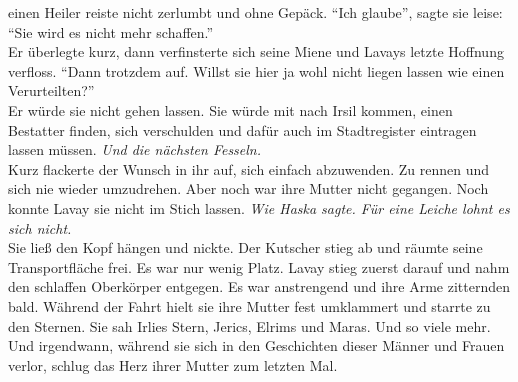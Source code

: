 einen Heiler reiste nicht zerlumbt und ohne Gepäck. ``Ich glaube'', sagte sie leise: ``Sie wird 
es nicht mehr schaffen.''\\
Er überlegte kurz, dann verfinsterte sich seine Miene und Lavays letzte Hoffnung verfloss. ``Dann 
trotzdem auf. Willst sie hier ja wohl nicht liegen lassen wie einen Verurteilten?''\\
Er würde sie nicht gehen lassen. Sie würde mit nach Irsil kommen, einen Bestatter finden, sich 
verschulden und dafür auch im Stadtregister eintragen lassen müssen. \textit{Und die nächsten 
Fesseln.}\\
Kurz flackerte der Wunsch in ihr auf, sich einfach abzuwenden. Zu rennen und sich nie wieder 
umzudrehen. Aber noch war ihre Mutter nicht gegangen. Noch konnte Lavay sie nicht im Stich lassen. 
\textit{Wie Haska sagte. Für eine Leiche lohnt es sich nicht.}\\
Sie ließ den Kopf hängen und nickte. Der Kutscher stieg ab und räumte seine Transportfläche frei. 
Es war nur wenig Platz. Lavay stieg zuerst darauf und nahm den schlaffen Oberkörper entgegen. Es 
war anstrengend und ihre Arme zitternden bald. Während der Fahrt hielt sie ihre Mutter fest 
umklammert und starrte zu den Sternen. Sie sah Irlies Stern, Jerics, Elrims und Maras. Und so viele 
mehr. Und irgendwann, während sie sich in den Geschichten dieser Männer und Frauen verlor, schlug 
das Herz ihrer Mutter zum letzten Mal.\\

